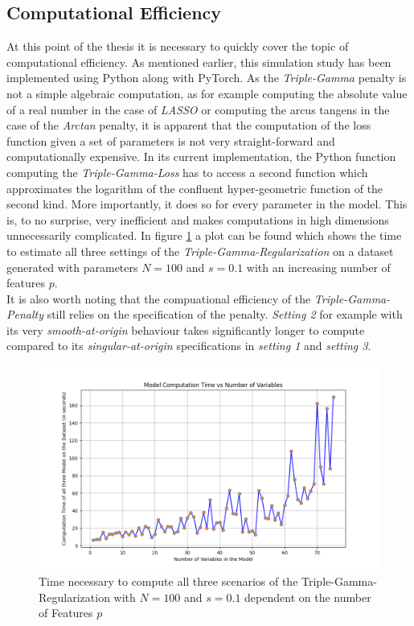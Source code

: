 \documentclass[12pt,a4paper]{article}
\begin{document}
\newpage
\subsection{Computational Efficiency}
At this point of the thesis it is necessary to quickly cover the topic of computational efficiency. As mentioned earlier, this simulation study has been implemented using Python along with PyTorch. As the \textit{Triple-Gamma} penalty is not a simple algebraic computation, as for example computing the absolute value of a real number in the case of \textit{LASSO} or computing the arcus tangens in the case of the \textit{Arctan} penalty, it is apparent that the computation of the loss function given a set of parameters is not very straight-forward and computationally expensive. In its current implementation, the Python function computing the \textit{Triple-Gamma-Loss} has to access a second function which approximates the logarithm of the confluent hyper-geometric  function of the second kind. More importantly, it does so for every parameter in the model. This is, to no surprise, very inefficient and makes computations in high dimensions unnecessarily complicated. In figure \ref{fig:ComputationTime} a plot can be found which shows the time to estimate all three settings of the \textit{Triple-Gamma-Regularization} on a dataset generated with parameters $N=100$ and $s=0.1$ with an increasing number of features $p$.\\

It is also worth noting that the compuational efficiency of the \textit{Triple-Gamma-Penalty} still relies on the specification of the penalty. \textit{Setting 2} for example with its very \textit{smooth-at-origin} behaviour takes significantly longer to compute compared to its \textit{singular-at-origin} specifications in \textit{setting 1} and \textit{setting 3}.


\begin{figure}[h!]
\centering
\includegraphics[scale=0.55]{../02_simulation/021_simulation_figures/ComputationTime_Example.png}
\caption{Time necessary to compute all three scenarios of the Triple-Gamma-Regularization with $N=100$ and $s=0.1$ dependent on the number of Features $p$}
\label{fig:ComputationTime}
\end{figure} 	
\end{document}
